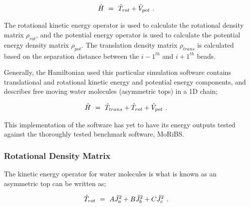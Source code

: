 \documentclass[11pt]{article}
\begin{document}
\begin{equation} \label{wr-eq-61-1}
\hat{H} \hspace{0.125cm} = \hspace{0.125cm} \hat{T}_{rot} + \hat{V}_{pot} \hspace{0.125cm} .
\end{equation}

The rotational kinetic energy operator is used to calculate the rotational density matrix \begin{math} \rho_{rot} \end{math}, and the potential energy operator is used to calculate the potential energy density matrix \begin{math} \rho_{pot} \end{math}. The translation density matrix \begin{math} \rho_{trans} \end{math} is calculated based on the separation distance between the \begin{math} i-1^{th} \end{math} and \begin{math} i+1^{th} \end{math} beads. 

Generally, the Hamiltonian used this particular simulation software contains translational and rotational kinetic energy and potential energy components, and describes free moving water molecules (asymmetric tops) in a 1D chain;

\begin{equation} \label{wr-eq-61-2}
\hat{H} \hspace{0.125cm} = \hspace{0.125cm} \hat{T}_{trans} + \hat{T}_{rot} + \hat{V}_{pot} \hspace{0.125cm} .
\end{equation}

This implementation of the software has yet to have its energy outputs tested against the thoroughly tested benchmark software, MoRiBS. 

\subsubsection{Rotational Density Matrix}

The kinetic energy operator for water molecules is what is known as an asymmetric top can be written as;

\begin{equation} \label{wr-eq-66-1}
\hat{T}_{rot} \hspace{0.125cm} = \hspace{0.125cm} A \hat{J}^{2}_{a} + B \hat{J}^{2}_{b} + C \hat{J}^{2}_{c} \hspace{0.125cm} .
\end{equation}
\end{document}
